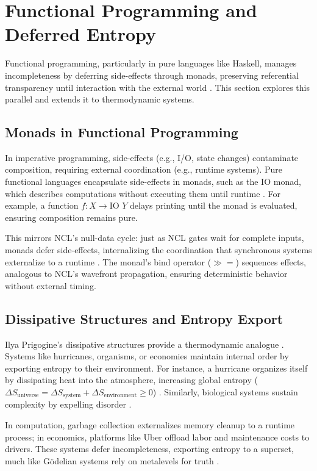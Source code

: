 \documentclass{article}
\begin{document}
\section{Functional Programming and Deferred Entropy}
\label{sec:programming_entropy}
Functional programming, particularly in pure languages like Haskell, manages incompleteness by deferring side-effects through monads, preserving referential transparency until interaction with the external world \citep{wadler1992, turner1979}. This section explores this parallel and extends it to thermodynamic systems.

\subsection{Monads in Functional Programming}
In imperative programming, side-effects (e.g., I/O, state changes) contaminate composition, requiring external coordination (e.g., runtime systems). Pure functional languages encapsulate side-effects in monads, such as the IO monad, which describes computations without executing them until runtime \citep{wadler1992}. For example, a function \(f : X \to \text{IO } Y\) delays printing until the monad is evaluated, ensuring composition remains pure.

This mirrors NCL's null-data cycle: just as NCL gates wait for complete inputs, monads defer side-effects, internalizing the coordination that synchronous systems externalize to a runtime \citep{turner1979}. The monad's bind operator (\(\gg=\)) sequences effects, analogous to NCL's wavefront propagation, ensuring deterministic behavior without external timing.

\subsection{Dissipative Structures and Entropy Export}
Ilya Prigogine's dissipative structures provide a thermodynamic analogue \citep{prigogine1984, nicolis1977}. Systems like hurricanes, organisms, or economies maintain internal order by exporting entropy to their environment. For instance, a hurricane organizes itself by dissipating heat into the atmosphere, increasing global entropy (\(\Delta S_{\text{universe}} = \Delta S_{\text{system}} + \Delta S_{\text{environment}} \geq 0\)) \citep{nicolis1977}. Similarly, biological systems sustain complexity by expelling disorder \citep{schneider2005}.

In computation, garbage collection externalizes memory cleanup to a runtime process; in economics, platforms like Uber offload labor and maintenance costs to drivers. These systems defer incompleteness, exporting entropy to a superset, much like G\"{o}delian systems rely on metalevels for truth \citep{tarski1956}.
\end{document}
